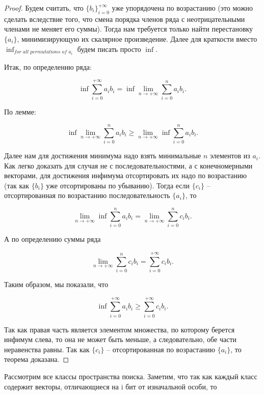 \begin{proof}
    

Будем считать, что $\{b_i\}_{i = 0}^{+\infty}$ уже упорядочена по возрастанию (это можно сделать вследствие того, что смена порядка членов ряда с неотрицательными членами не меняет его суммы). Тогда нам требуется только найти перестановку $\{a_i\}$, минимизирующую их скалярное произведение. Далее для краткости вместо $\inf_{\textit{for all permutations of }a_i}$ будем писать просто $\inf$.

Итак, по определению ряда:

$$\inf \sum_{i = 0}^{+\infty} a_i b_i = \inf \lim_{n \to +\infty} \sum_{i = 0}^{n} a_i b_i.$$

По лемме:

$$\inf \lim_{n \to +\infty} \sum_{i = 0}^{n} a_i b_i \ge \lim_{n \to +\infty} \inf \sum_{i = 0}^{n} a_i b_i.$$

Далее нам для достижения минимума надо взять минимальные $n$ элементов из $a_i$. Как легко доказать для случая не с последовательностями, а с конечномерными векторами, для достижения инфимума отсортировать их надо по возрастанию (так как $\{b_i\}$ уже отсортированы по убыванию). Тогда если $\{c_i\}$ -- отсортированная по возрастанию последовательность $\{a_i\}$, то

$$\lim_{n \to +\infty} \inf \sum_{i = 0}^{n} a_i b_i = \lim_{n \to +\infty} \sum_{i = 0}^{n} c_i b_i.$$

А по определению суммы ряда

$$\lim_{n \to +\infty} \sum_{i = 0}^{n} c_i b_i = \sum_{i = 0}^{+\infty} c_i b_i.$$

Таким образом, мы показали, что 

$$\inf \sum_{i = 0}^{+\infty} a_i b_i \ge \sum_{i = 0}^{+\infty} c_i b_i.$$

Так как правая часть является элементом множества, по которому берется инфимум слева, то она не может быть меньше, а следовательно, обе части неравенства равны. Так как $\{c_i\}$ -- отсортированная по возрастанию $\{a_i\}$, то теорема доказана.

\end{proof}

Рассмотрим все классы пространства поиска. Заметим, что так как каждый класс содержит векторы, отличающиеся на i бит от изначальной особи, то 
